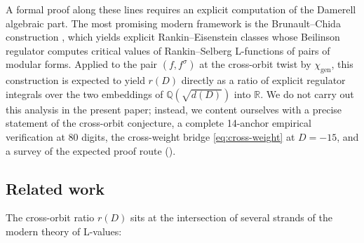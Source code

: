 \documentclass[11pt]{amsart}
\theoremstyle{definition}
\theoremstyle{remark}
\newcommand{\Q}{\mathbb{Q}}
\newcommand{\R}{\mathbb{R}}
\begin{document}
A formal proof along these lines requires an explicit computation
of the Damerell algebraic part. The most promising modern framework
is the Brunault--Chida construction
\cite{BrunaultChida2015}, which yields explicit Rankin--Eisenstein
classes whose Beilinson regulator computes critical values of
Rankin--Selberg L-functions of pairs of modular forms. Applied to
the pair \((f, f^{\sigma})\) at the cross-orbit twist by
\(\chi_{\mathrm{gen}}\), this construction is expected to yield
\(r(D)\) directly as a ratio of explicit regulator integrals over the
two embeddings of \(\Q(\sqrt{d(D)})\) into \(\R\). We do not carry out
this analysis in the present paper; instead, we content ourselves
with a precise statement of the cross-orbit conjecture, a complete
14-anchor empirical verification at \(80\) digits, the cross-weight
bridge \eqref{eq:cross-weight} at \(D = -15\), and a survey of the
expected proof route ().

\subsection{Related work}\label{ssec:related}

The cross-orbit ratio \(r(D)\) sits at the intersection of several
strands of the modern theory of L-values:
\end{document}
